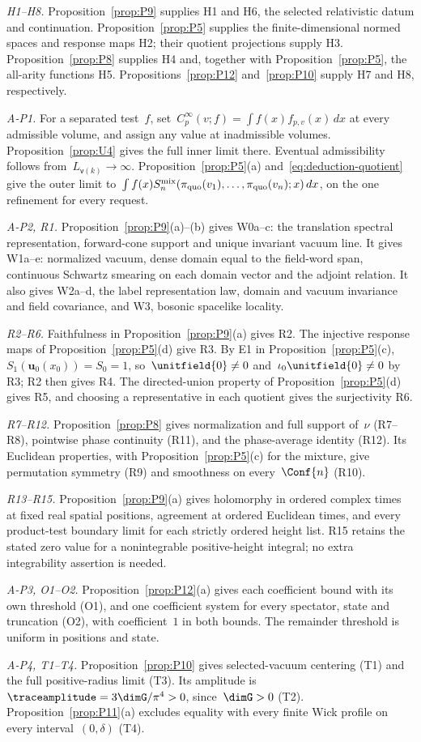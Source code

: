 \emph{H1--H8.} Proposition~\ref{prop:P9} supplies H1 and H6, the selected relativistic datum and continuation. Proposition~\ref{prop:P5} supplies the finite-dimensional normed spaces and response maps H2; their quotient projections supply H3. Proposition~\ref{prop:P8} supplies H4 and, together with Proposition~\ref{prop:P5}, the all-arity functions H5. Propositions~\ref{prop:P12} and~\ref{prop:P10} supply H7 and H8, respectively.

\emph{A-P1.} For a separated test~$f$, set~$C_p^\infty(v;f)=\int f(x)f_{p,v}(x)\,dx$ at every admissible volume, and assign any value at inadmissible volumes. Proposition~\ref{prop:U4} gives the full inner limit there. Eventual admissibility follows from~$L_{\mathsf v(k)}\to\infty$. Proposition~\ref{prop:P5}(a) and~\eqref{eq:deduction-quotient} give the outer limit to~$\int f(x)S_n^{\rm mix}(\pi_{\rm quo}(v_1),\ldots,\pi_{\rm quo}(v_n);x)\,dx$, on the one refinement for every request.

\emph{A-P2, R1.} Proposition~\ref{prop:P9}(a)--(b) gives W0a--c: the translation spectral representation, forward-cone support and unique invariant vacuum line. It gives W1a--e: normalized vacuum, dense domain equal to the field-word span, continuous Schwartz smearing on each domain vector and the adjoint relation. It also gives W2a--d, the label representation law, domain and vacuum invariance and field covariance, and W3, bosonic spacelike locality.

\emph{R2--R6.} Faithfulness in Proposition~\ref{prop:P9}(a) gives R2. The injective response maps of Proposition~\ref{prop:P5}(d) give R3. By E1 in Proposition~\ref{prop:P5}(c), $S_1(\mathbf u_0(x_0))=S_0=1$, so~$\unitfield{0}\ne0$ and~$\iota_0\unitfield{0}\ne0$ by R3; R2 then gives R4. The directed-union property of Proposition~\ref{prop:P5}(d) gives R5, and choosing a representative in each quotient gives the surjectivity R6.

\emph{R7--R12.} Proposition~\ref{prop:P8} gives normalization and full support of~$\nu$ (R7--R8), pointwise phase continuity (R11), and the phase-average identity (R12). Its Euclidean properties, with Proposition~\ref{prop:P5}(c) for the mixture, give permutation symmetry (R9) and smoothness on every~$\Conf{n}$ (R10).

\emph{R13--R15.} Proposition~\ref{prop:P9}(a) gives holomorphy in ordered complex times at fixed real spatial positions, agreement at ordered Euclidean times, and every product-test boundary limit for each strictly ordered height list. R15 retains the stated zero value for a nonintegrable positive-height integral; no extra integrability assertion is needed.

\emph{A-P3, O1--O2.} Proposition~\ref{prop:P12}(a) gives each coefficient bound with its own threshold (O1), and one coefficient system for every spectator, state and truncation (O2), with coefficient~$1$ in both bounds. The remainder threshold is uniform in positions and state.

\emph{A-P4, T1--T4.} Proposition~\ref{prop:P10} gives selected-vacuum centering (T1) and the full positive-radius limit (T3). Its amplitude is~$\traceamplitude=3\dimG/\pi^4>0$, since~$\dimG>0$ (T2). Proposition~\ref{prop:P11}(a) excludes equality with every finite Wick profile on every interval~$(0,\delta)$ (T4).
